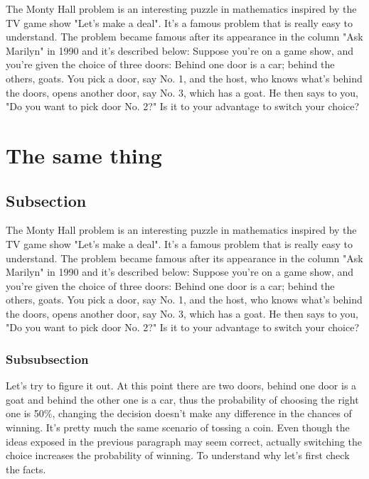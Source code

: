 \documentclass[preprint]{oscmjournal}
\begin{document}
The Monty Hall problem is an interesting puzzle in mathematics inspired by the TV  game show "Let's make a deal". It's a famous problem that is really easy to understand. The problem became famous after its appearance in the column "Ask Marilyn" in 1990 and  it's described below: Suppose you're on a game show, and you're given the choice of three doors: Behind one  door is a car; behind the others, goats. You pick a door, say No. 1, and the host, who  knows what's behind the doors, opens another door, say No. 3, which has a goat. He then  says to you, "Do you want to pick door No. 2?" Is it to your advantage to switch your choice?



\section{The same thing}

\subsection{Subsection}

The Monty Hall problem is an interesting puzzle in mathematics inspired by the TV  game show "Let's make a deal". It's a famous problem that is really easy to understand. The problem became famous after its appearance in the column "Ask Marilyn" in 1990 and  it's described below: Suppose you're on a game show, and you're given the choice of three doors: Behind one  door is a car; behind the others, goats. You pick a door, say No. 1, and the host, who  knows what's behind the doors, opens another door, say No. 3, which has a goat. He then  says to you, "Do you want to pick door No. 2?" Is it to your advantage to switch your choice?
\subsubsection{Subsubsection}

Let's try to figure it out. At this point there are two doors, behind one door is a goat  and behind the other one is a car, thus the probability of choosing the right one is 50\%, changing the decision doesn't make any difference in the chances of winning. It's pretty much the same scenario of tossing a coin. Even though the ideas exposed in the previous paragraph may seem correct, actually switching the choice increases the probability of winning. To understand why let's  first check the facts.
\end{document}
